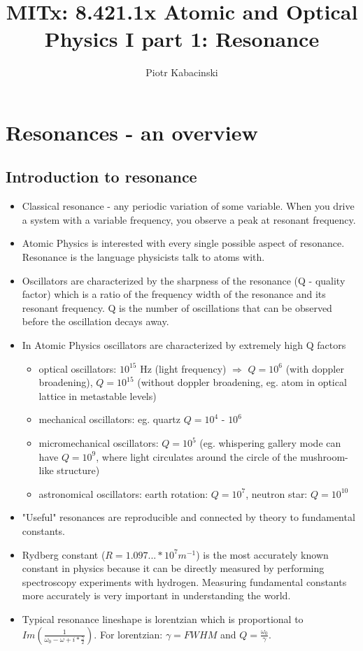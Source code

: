 
\title{MITx: 8.421.1x Atomic and Optical Physics I part 1: Resonance}
\author{Piotr Kabacinski}

\maketitle

\section{Resonances - an overview}
	\subsection{Introduction to resonance}
					\begin{itemize}
						\item Classical resonance - any periodic variation of some variable. When you drive a system with a variable frequency, you observe a peak at resonant frequency.
						\item Atomic Physics is interested with every single possible aspect of resonance. Resonance is the language physicists talk to atoms with.
						\item Oscillators are characterized by the sharpness of the resonance (Q - quality factor) which is a ratio of the frequency width of the resonance and its resonant frequency. Q is the number of oscillations that can be observed before the oscillation decays away.
						\item In Atomic Physics oscillators are characterized by extremely high Q factors
							\begin{itemize}
								\item optical oscillators: $10^{15}$ Hz (light frequency) $\Rightarrow$ $Q = 10^6$	(with doppler broadening), $Q = 10^{15}$ (without doppler broadening, eg. atom in optical lattice in metastable levels)
								\item mechanical oscillators: eg. quartz $Q = 10^4$ - $10^6$
								\item micromechanical oscillators: $Q = 10^5$ (eg. whispering gallery mode can have $Q = 10^9$, where light circulates around the circle of the mushroom-like structure)
								\item astronomical oscillators: earth rotation: $Q = 10^7$, neutron star: $Q = 10^{10}$
							\end{itemize}
						\item "Useful" resonances are reproducible and connected by theory to fundamental constants.
						\item Rydberg constant ($R = 1.097... * 10^7 m^{-1}$) is the most accurately known constant in physics because it can be directly measured by performing spectroscopy experiments with hydrogen. Measuring fundamental constants more accurately is very important in understanding the world.
						\item Typical resonance lineshape is lorentzian which is proportional to $Im\left(\frac{1}{\omega_0-\omega+i*\frac{\gamma}{2}}\right)$. For lorentzian: $\gamma = FWHM$ and $Q = \frac{\omega_0}{\gamma}$.
					\end{itemize}
